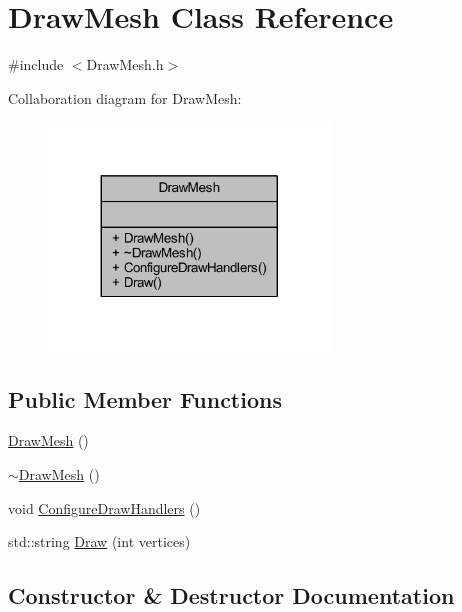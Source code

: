 \hypertarget{class_draw_mesh}{}\section{Draw\+Mesh Class Reference}
\label{class_draw_mesh}


{\ttfamily \#include $<$Draw\+Mesh.\+h$>$}



Collaboration diagram for Draw\+Mesh\+:
\nopagebreak
\begin{figure}[H]
\begin{center}
\leavevmode
\includegraphics[width=212pt]{class_draw_mesh__coll__graph}
\end{center}
\end{figure}
\subsection*{Public Member Functions}
\begin{DoxyCompactItemize}
\item 
\mbox{\hyperlink{class_draw_mesh_a82e6b9552562eb9ac7a180e9e8c4d692}{Draw\+Mesh}} ()
\item 
\mbox{\hyperlink{class_draw_mesh_ab4abfd945c517dc323a27b372450bd74}{$\sim$\+Draw\+Mesh}} ()
\item 
void \mbox{\hyperlink{class_draw_mesh_ab095d024d70e38ae188307e14256b590}{Configure\+Draw\+Handlers}} ()
\item 
std\+::string \mbox{\hyperlink{class_draw_mesh_a5bb39b5c9cd69fd5c4decee6a875ca5a}{Draw}} (int vertices)
\end{DoxyCompactItemize}


\subsection{Constructor \& Destructor Documentation}
\mbox{\label{class_draw_mesh_a82e6b9552562eb9ac7a180e9e8c4d692}} 
